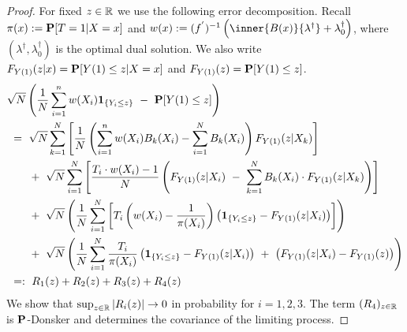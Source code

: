 \begin{proof}
  For fixed $z\in\R$ we use the following error decomposition.
  Recall $\pi(x):=\P[T=1|X=x]$ and
  $
  w(x)
  :=
  (
  f^{'}
  )^{-1}
  \left( 
    \inner{B(x)}{\lambda^\dagger}
    +
    \lambda_0^\dagger
  \right)
  $,
  where $(\lambda^\dagger,\lambda_0^\dagger)$ is the optimal dual solution.
  We also write
  $
  F_{Y(1)}(z|x)
  =
  \P[Y(1)\le z|X=x]
  $
  and
  $
  F_{Y(1)}(z)
  =
  \P[Y(1)\le z]
  $.
\begin{align*}
  &
  \sqrt{N}
\left( 
    \frac{1}{N}
    \sum_{i=1}^{n} 
    w(X_i)
    \mathbf{1}_{\left\{ Y_i \le z \right\}}
    \ 
    -
    \ 
    \P[Y(1)\le z]
\right)
    \\
  &
  \ 
  =
  \ 
  \sqrt{N}
  \sum_{k=1}^{N} 
  \left[ 
  \frac{1}{N}
  \left( 
    \sum_{i=1}^{n} 
    w(X_i)
    B_k(X_i)
    -
    \sum_{i=1}^{N} 
    B_k(X_i)
  \right)
  F_{Y(1)}(z|X_k)
  \right]
  \\
  &
  \qquad
  +
  \ 
  \sqrt{N}
    \sum_{i=1}^{N} 
    \left[ 
  \frac{
    T_i\cdot w(X_i) -1 }{N}
    \left( 
  F_{Y(1)}(z|X_i)
    \ 
    -
    \ 
    \sum_{k=1}^{N} 
    B_k(X_i)
    \cdot
  F_{Y(1)}(z|X_k)
    \right)
    \right]
  \\
  &
  \qquad
  +
  \ 
  \sqrt{N}
  \left( 
  \frac{1}{N}
    \sum_{i=1}^{N} 
    \left[ 
    T_i
    \left( 
    w(X_i) 
    -
    \frac{1}{\pi(X_i)}
    \right)
    \left( 
    \mathbf{1}_{\left\{ Y_i \le z \right\}}
    -
  F_{Y(1)}(z|X_i)
    \right)
    \right]
  \right)
  \\
  &
  \qquad
  +
  \ 
  \sqrt{N}
  \left( 
  \frac{1}{N}
    \sum_{i=1}^{N} 
    \frac{T_i}{\pi(X_i)}
    \left( 
    \mathbf{1}_{\left\{ Y_i \le z \right\}}
    -
  F_{Y(1)}(z|X_i)
    \right)
    \ 
    +
    \ 
    \left( 
  F_{Y(1)}(z|X_i)
    -
  F_{Y(1)}(z)
    \right)
  \right)
  \\
  &
  \ 
  =:
  \ 
  R_1(z)
  +
  R_2(z)
  +
  R_3(z)
  +
  R_4(z)
  \end{align*}
  We show that $\sup_{z\in\R}\left| R_i(z) \right|\to 0 $ in
  probability for $i=1,2,3$.
  The term $(R_4)_{z\in\R}$ is $\P$-Donsker and determines the covariance of the limiting process.

\end{proof}
